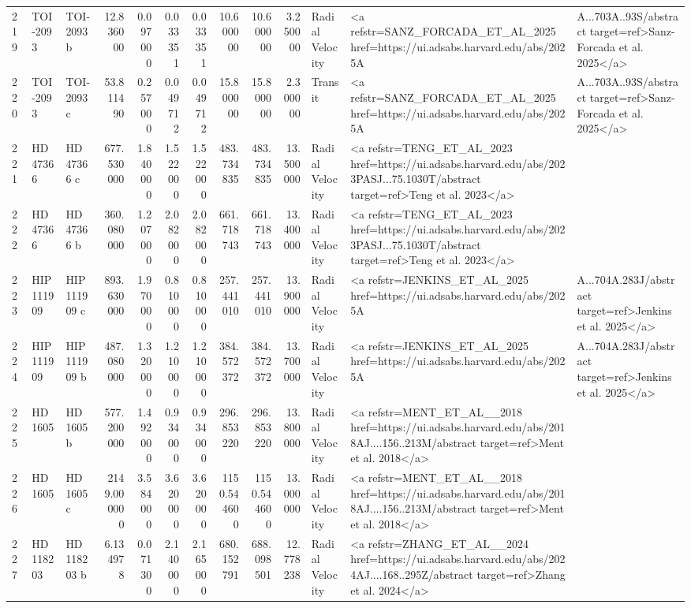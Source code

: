\begin{tabular}{lllrrrrrrrll}
219 & TOI-2093 & TOI-2093 b & 12.836000 & 0.097000 & 0.033351 & 0.033351 & 10.600000 & 10.600000 & 3.250000 & Radial Velocity & <a refstr=SANZ_FORCADA_ET_AL_2025 href=https://ui.adsabs.harvard.edu/abs/2025A&A...703A..93S/abstract target=ref>Sanz-Forcada et al. 2025</a> \\
220 & TOI-2093 & TOI-2093 c & 53.811490 & 0.257000 & 0.049712 & 0.049712 & 15.800000 & 15.800000 & 2.300000 & Transit & <a refstr=SANZ_FORCADA_ET_AL_2025 href=https://ui.adsabs.harvard.edu/abs/2025A&A...703A..93S/abstract target=ref>Sanz-Forcada et al. 2025</a> \\
221 & HD 47366 & HD 47366 c & 677.530000 & 1.840000 & 1.522000 & 1.522000 & 483.734835 & 483.734835 & 13.500000 & Radial Velocity & <a refstr=TENG_ET_AL_2023 href=https://ui.adsabs.harvard.edu/abs/2023PASJ...75.1030T/abstract target=ref>Teng et al. 2023</a> \\
222 & HD 47366 & HD 47366 b & 360.080000 & 1.207000 & 2.082000 & 2.082000 & 661.718743 & 661.718743 & 13.400000 & Radial Velocity & <a refstr=TENG_ET_AL_2023 href=https://ui.adsabs.harvard.edu/abs/2023PASJ...75.1030T/abstract target=ref>Teng et al. 2023</a> \\
223 & HIP 111909 & HIP 111909 c & 893.630000 & 1.970000 & 0.810000 & 0.810000 & 257.441010 & 257.441010 & 13.900000 & Radial Velocity & <a refstr=JENKINS_ET_AL_2025 href=https://ui.adsabs.harvard.edu/abs/2025A&A...704A.283J/abstract target=ref>Jenkins et al. 2025</a> \\
224 & HIP 111909 & HIP 111909 b & 487.080000 & 1.320000 & 1.210000 & 1.210000 & 384.572372 & 384.572372 & 13.700000 & Radial Velocity & <a refstr=JENKINS_ET_AL_2025 href=https://ui.adsabs.harvard.edu/abs/2025A&A...704A.283J/abstract target=ref>Jenkins et al. 2025</a> \\
225 & HD 1605 & HD 1605 b & 577.200000 & 1.492000 & 0.934000 & 0.934000 & 296.853220 & 296.853220 & 13.800000 & Radial Velocity & <a refstr=MENT_ET_AL__2018 href=https://ui.adsabs.harvard.edu/abs/2018AJ....156..213M/abstract target=ref>Ment et al. 2018</a> \\
226 & HD 1605 & HD 1605 c & 2149.000000 & 3.584000 & 3.620000 & 3.620000 & 1150.544600 & 1150.544600 & 13.000000 & Radial Velocity & <a refstr=MENT_ET_AL__2018 href=https://ui.adsabs.harvard.edu/abs/2018AJ....156..213M/abstract target=ref>Ment et al. 2018</a> \\
227 & HD 118203 & HD 118203 b & 6.134978 & 0.071300 & 2.140000 & 2.165000 & 680.152791 & 688.098501 & 12.778238 & Radial Velocity & <a refstr=ZHANG_ET_AL__2024 href=https://ui.adsabs.harvard.edu/abs/2024AJ....168..295Z/abstract target=ref>Zhang et al. 2024</a> \\

\end{tabular}
